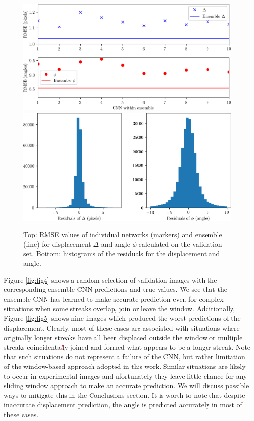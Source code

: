 \documentclass{svjour3}                     %
\newcommand{\new}[1]{\textit{\textcolor{red}{#1}}}
\begin{document}
\begin{figure}
\includegraphics[width=\textwidth]{figs/figure2a.png}
\includegraphics[width=\textwidth]{figs/figure2b.png}
\caption{Top: RMSE values of individual networks (markers) and ensemble (line) for displacement $\Delta$ and angle $\phi$ calculated on the validation set. Bottom: histograms of the residuals for the displacement and angle.}
\label{fig:fig3}
\end{figure}

Figure \ref{fig:fig4} shows a random selection of validation images with the corresponding ensemble CNN predictions and true values. We see that the ensemble CNN has learned to make accurate prediction even for complex situations when some streaks overlap, join or leave the window. Additionally, Figure \ref{fig:fig5} shows nine images which produced the worst predictions of the displacement. Clearly, most of these cases are associated with situations where originally longer streaks have all been displaced outside the window or multiple streaks coincidenta\new{l}ly joined and formed what appears to be a longer streak. Note that such situations do not represent a failure of the CNN, but rather limitation of the window-based approach adopted in this work. Similar situations are likely to occur in experimental images and ufortunately they leave little chance for any sliding window approach to make an accurate prediction. We will discuss possible ways to mitigate this in the Conclusions section. It is worth to note that despite inaccurate displacement prediction, the angle is predicted accurately in most of these cases. 
\end{document}
